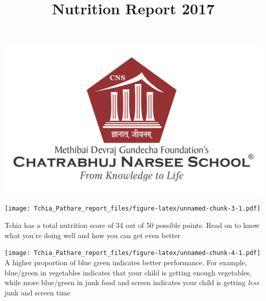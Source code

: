 \documentclass[]{article}
\title{Nutrition Report 2017}
\author{}
\date{}
\begin{document}
\maketitle

\includegraphics{cns_logo.png}

\newpage

\texttt{[image: Tchia\_Pathare\_report\_files/figure-latex/unnamed-chunk-3-1.pdf]}

Tchia has a total nutrition score of 34 out of 50 possible points. Read
on to know what you're doing well and how you can get even better

\texttt{[image: Tchia\_Pathare\_report\_files/figure-latex/unnamed-chunk-4-1.pdf]}
A higher proportion of blue green indicates better performance. For
example, blue/green in vegetables indicates that your child is getting
enough vegetables, while more blue/green in junk food and screen
indicates your child is getting \emph{less} junk and screen time
\end{document}
